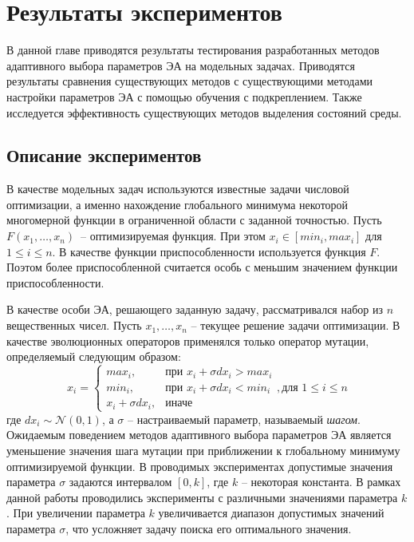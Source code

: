 \chapter{Результаты экспериментов}
\label{chapter_results}

В данной главе приводятся результаты тестирования разработанных методов адаптивного выбора параметров ЭА на модельных задачах. Приводятся результаты сравнения существующих методов с существующими методами настройки параметров ЭА с помощью обучения с подкреплением. Также исследуется эффективность существующих методов выделения состояний среды.

\section{Описание экспериментов}

В качестве модельных задач используются известные задачи числовой оптимизации, а именно нахождение глобального минимума некоторой многомерной функции в ограниченной области с заданной точностью. Пусть $F(x_1, \ldots, x_n)$~-- оптимизируемая функция. При этом $x_i \in [min_i, max_i]$ для $1 \le i \le n$. В качестве функции приспособленности используется функция $F$. Поэтом более приспособленной считается особь с меньшим значением функции приспособленности.

В качестве особи ЭА, решающего заданную задачу, рассматривался набор из $n$ вещественных чисел. Пусть $x_1, \ldots, x_n$ -- текущее решение задачи оптимизации. В качестве эволюционных операторов применялся только оператор мутации, определяемый следующим образом:
\begin{equation}
x_i = \begin{cases}
	max_i, &\text{при } x_i + \sigma dx_i > max_i \\
	min_i, &\text{при } x_i + \sigma dx_i < min_i \\
	x_i + \sigma dx_i, &\text{иначе}
      \end{cases}, \text{для } 1 \le i \le n
\end{equation}
где $dx_i \sim \mathcal{N}(0, 1)$, а $\sigma$ -- настраиваемый параметр, называемый \textit{шагом}. Ожидаемым поведением методов адаптивного выбора параметров ЭА является уменьшение значения шага мутации при приближении к глобальному минимуму оптимизируемой функции. В проводимых экспериментах допустимые значения параметра $\sigma$ задаются интервалом $[0, k]$, где $k$ -- некоторая константа. В рамках данной работы проводились эксперименты с различными значениями параметра $k$. При увеличении параметра $k$ увеличивается диапазон допустимых значений параметра $\sigma$, что усложняет задачу поиска его оптимального значения.

